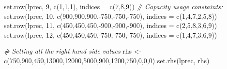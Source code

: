 \documentclass[
]{article}
\newenvironment{Shaded}{\begin{snugshade}}{\end{snugshade}}
\newcommand{\AttributeTok}[1]{\textcolor[rgb]{0.77,0.63,0.00}{#1}}
\newcommand{\CommentTok}[1]{\textcolor[rgb]{0.56,0.35,0.01}{\textit{#1}}}
\newcommand{\DecValTok}[1]{\textcolor[rgb]{0.00,0.00,0.81}{#1}}
\newcommand{\FunctionTok}[1]{\textcolor[rgb]{0.00,0.00,0.00}{#1}}
\newcommand{\NormalTok}[1]{#1}
\newcommand{\OtherTok}[1]{\textcolor[rgb]{0.56,0.35,0.01}{#1}}
\newcommand{\SpecialCharTok}[1]{\textcolor[rgb]{0.00,0.00,0.00}{#1}}
\begin{document}
\begin{Shaded}
\begin{Highlighting}[]
\FunctionTok{set.row}\NormalTok{(lprec, }\DecValTok{9}\NormalTok{, }\FunctionTok{c}\NormalTok{(}\DecValTok{1}\NormalTok{,}\DecValTok{1}\NormalTok{,}\DecValTok{1}\NormalTok{), }\AttributeTok{indices =} \FunctionTok{c}\NormalTok{(}\DecValTok{7}\NormalTok{,}\DecValTok{8}\NormalTok{,}\DecValTok{9}\NormalTok{))}
\CommentTok{\# Capacity usage constaints:}
\FunctionTok{set.row}\NormalTok{(lprec, }\DecValTok{10}\NormalTok{, }\FunctionTok{c}\NormalTok{(}\DecValTok{900}\NormalTok{,}\DecValTok{900}\NormalTok{,}\DecValTok{900}\NormalTok{,}\SpecialCharTok{{-}}\DecValTok{750}\NormalTok{,}\SpecialCharTok{{-}}\DecValTok{750}\NormalTok{,}\SpecialCharTok{{-}}\DecValTok{750}\NormalTok{), }\AttributeTok{indices =} \FunctionTok{c}\NormalTok{(}\DecValTok{1}\NormalTok{,}\DecValTok{4}\NormalTok{,}\DecValTok{7}\NormalTok{,}\DecValTok{2}\NormalTok{,}\DecValTok{5}\NormalTok{,}\DecValTok{8}\NormalTok{))}
\FunctionTok{set.row}\NormalTok{(lprec, }\DecValTok{11}\NormalTok{, }\FunctionTok{c}\NormalTok{(}\DecValTok{450}\NormalTok{,}\DecValTok{450}\NormalTok{,}\DecValTok{450}\NormalTok{,}\SpecialCharTok{{-}}\DecValTok{900}\NormalTok{,}\SpecialCharTok{{-}}\DecValTok{900}\NormalTok{,}\SpecialCharTok{{-}}\DecValTok{900}\NormalTok{), }\AttributeTok{indices =} \FunctionTok{c}\NormalTok{(}\DecValTok{2}\NormalTok{,}\DecValTok{5}\NormalTok{,}\DecValTok{8}\NormalTok{,}\DecValTok{3}\NormalTok{,}\DecValTok{6}\NormalTok{,}\DecValTok{9}\NormalTok{))}
\FunctionTok{set.row}\NormalTok{(lprec, }\DecValTok{12}\NormalTok{, }\FunctionTok{c}\NormalTok{(}\DecValTok{450}\NormalTok{,}\DecValTok{450}\NormalTok{,}\DecValTok{450}\NormalTok{,}\SpecialCharTok{{-}}\DecValTok{750}\NormalTok{,}\SpecialCharTok{{-}}\DecValTok{750}\NormalTok{,}\SpecialCharTok{{-}}\DecValTok{750}\NormalTok{), }\AttributeTok{indices =} \FunctionTok{c}\NormalTok{(}\DecValTok{1}\NormalTok{,}\DecValTok{4}\NormalTok{,}\DecValTok{7}\NormalTok{,}\DecValTok{3}\NormalTok{,}\DecValTok{6}\NormalTok{,}\DecValTok{9}\NormalTok{))}
\end{Highlighting}
\end{Shaded}

\begin{Shaded}
\begin{Highlighting}[]
\CommentTok{\# Setting all the right hand side values}
\NormalTok{rhs }\OtherTok{\textless{}{-}} \FunctionTok{c}\NormalTok{(}\DecValTok{750}\NormalTok{,}\DecValTok{900}\NormalTok{,}\DecValTok{450}\NormalTok{,}\DecValTok{13000}\NormalTok{,}\DecValTok{12000}\NormalTok{,}\DecValTok{5000}\NormalTok{,}\DecValTok{900}\NormalTok{,}\DecValTok{1200}\NormalTok{,}\DecValTok{750}\NormalTok{,}\DecValTok{0}\NormalTok{,}\DecValTok{0}\NormalTok{,}\DecValTok{0}\NormalTok{)}
\FunctionTok{set.rhs}\NormalTok{(lprec, rhs)}
\end{Highlighting}
\end{Shaded}
\end{document}

